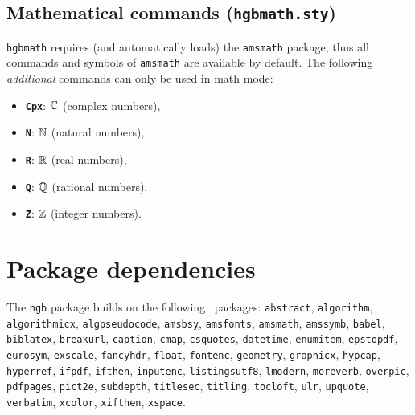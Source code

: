 \documentclass[english]{hgbarticle}
\begin{document}
\subsection{Mathematical commands (\texttt{hgbmath.sty})}

\texttt{hgbmath} requires (and automatically loads) the \texttt{amsmath} package, thus all
commands and symbols of \texttt{amsmath} are available by default.
The following \emph{additional} commands can only be used in math mode:
%
\begin{itemize}
\item \textbf{\texttt{{\bs}Cpx}}: $\mathbb{C}$ (complex numbers),
\item \textbf{\texttt{{\bs}N}}: $\mathbb{N}$ (natural numbers),
\item \textbf{\texttt{{\bs}R}}: $\mathbb{R}$ (real numbers),
\item \textbf{\texttt{{\bs}Q}}: $\mathbb{Q}$ (rational numbers),
\item \textbf{\texttt{{\bs}Z}}: $\mathbb{Z}$ (integer numbers).
\end{itemize}


\section{Package dependencies}


%
\begin{sloppypar}
The \texttt{hgb} package builds on the following \latex\ packages:\newline
\texttt{abstract}, 
\texttt{algorithm}, 
\texttt{algorithmicx}, 
\texttt{algpseudocode}, 
\texttt{amsbsy}, 
\texttt{amsfonts}, 
\texttt{amsmath}, 
\texttt{amssymb}, 
\texttt{babel}, 
\texttt{biblatex}, 
\texttt{breakurl}, 
\texttt{caption}, 
\texttt{cmap}, 
\texttt{csquotes}, 
\texttt{datetime}, 
\texttt{enumitem}, 
\texttt{epstopdf}, 
\texttt{eurosym}, 
\texttt{exscale}, 
\texttt{fancyhdr}, 
\texttt{float}, 
\texttt{fontenc}, 
\texttt{geometry}, 
\texttt{graphicx}, 
\texttt{hypcap}, 
\texttt{hyperref}, 
\texttt{ifpdf}, 
\texttt{ifthen}, 
\texttt{inputenc}, 
\texttt{listingsutf8}, 
\texttt{lmodern}, 
\texttt{moreverb}, 
\texttt{overpic}, 
\texttt{pdfpages}, 
\texttt{pict2e}, 
\texttt{subdepth}, 
\texttt{titlesec}, 
\texttt{titling}, 
\texttt{tocloft}, 
\texttt{ulr}, 
\texttt{upquote}, 
\texttt{verbatim}, 
\texttt{xcolor}, 
\texttt{xifthen}, 
\texttt{xspace}.
\end{sloppypar}
\end{document}
